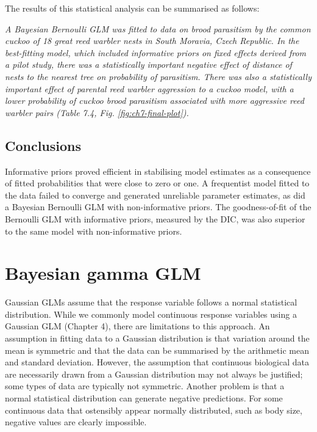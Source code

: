 \documentclass[
]{book}
\begin{document}
The results of this statistical analysis can be summarised as follows:

\emph{A Bayesian Bernoulli GLM was fitted to data on brood parasitism by the common cuckoo of 18 great reed warbler nests in South Moravia, Czech Republic. In the best-fitting model, which included informative priors on fixed effects derived from a pilot study, there was a statistically important negative effect of distance of nests to the nearest tree on probability of parasitism. There was also a statistically important effect of parental reed warbler aggression to a cuckoo model, with a lower probability of cuckoo brood parasitism associated with more aggressive reed warbler pairs (Table 7.4, Fig. \ref{fig:ch7-final-plot}).}

\hypertarget{conclusions-4}{%
\section{Conclusions}\label{conclusions-4}}

Informative priors proved efficient in stabilising model estimates as a consequence of fitted probabilities that were close to zero or one. A frequentist model fitted to the data failed to converge and generated unreliable parameter estimates, as did a Bayesian Bernoulli GLM with non-informative priors. The goodness-of-fit of the Bernoulli GLM with informative priors, measured by the DIC, was also superior to the same model with non-informative priors.

\hypertarget{gamma-glm}{%
\chapter{Bayesian gamma GLM}\label{gamma-glm}}

Gaussian GLMs assume that the response variable follows a normal statistical distribution. While we commonly model continuous response variables using a Gaussian GLM (Chapter 4), there are limitations to this approach. An assumption in fitting data to a Gaussian distribution is that variation around the mean is symmetric and that the data can be summarised by the arithmetic mean and standard deviation. However, the assumption that continuous biological data are necessarily drawn from a Gaussian distribution may not always be justified; some types of data are typically not symmetric. Another problem is that a normal statistical distribution can generate negative predictions. For some continuous data that ostensibly appear normally distributed, such as body size, negative values are clearly impossible.
\end{document}
